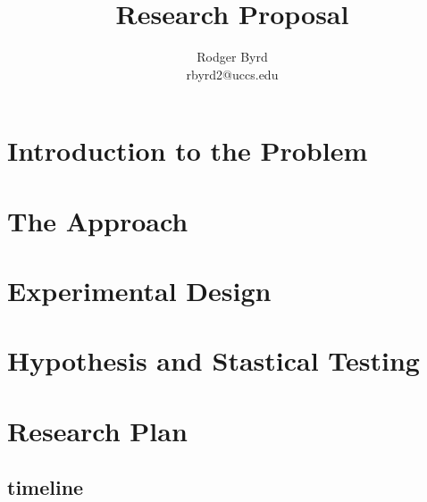 \documentclass[conference]{IEEEtran}
\begin{document}

\title{Research Proposal}
\author{Rodger Byrd\\rbyrd2@uccs.edu}
\maketitle



\section{Introduction to the Problem}

\section{The Approach}

\section{Experimental Design}

\section{Hypothesis and Stastical Testing}

\section{Research Plan}

\subsection{timeline}

\nocite{*}
\clearpage


%
%
\end{document}
